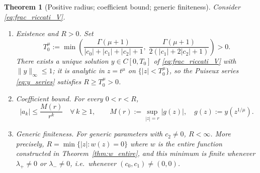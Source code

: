 \documentclass[12pt,a4paper]{amsart}
\newcommand{\assign}{:=}
\theoremstyle{plain}
\newtheorem{theorem}{Theorem}[section]
\theoremstyle{definition}
\theoremstyle{remark}
\begin{document}
\begin{theorem}[Positive radius; coefficient bound; generic
finiteness]\label{thm:radius}
Consider \eqref{eq:frac_riccati_V}.
\begin{enumerate}[label=(\roman*)]
\item \emph{Existence and $R>0$.} Set
\begin{equation}\label{eq:T0_choice}
  T_0^{\mu}\assign\min\!\left(
    \frac{\Gamma(\mu+1)}{|c_0|+|c_1|+|c_2|+1},\;
    \frac{\Gamma(\mu+1)}{2(|c_1|+2|c_2|+1)}
  \right)>0.
\end{equation}
There exists a unique solution $y\in C[0,T_0]$ of \eqref{eq:frac_riccati_V}
with $\|y\|_\infty\le 1$; it is analytic in $z=t^{\mu}$ on
$\{|z|<T_0^{\mu}\}$, so the Puiseux series \eqref{eq:y_series} satisfies
$R\ge T_0^{\mu}>0$.

\item \emph{Coefficient bound.} For every $0<r<R$,
\begin{equation}\label{eq:cauchy_bound}
  |a_k|\le\frac{M(r)}{r^k}\quad\forall\,k\ge 1,
  \qquad M(r)\assign\sup_{|z|=r}|g(z)|,\quad g(z)\assign y(z^{1/\mu}).
\end{equation}

\item \emph{Generic finiteness.}
For generic parameters with $c_2\ne 0$, $R<\infty$. More precisely,
$R=\min\{|z|:w(z)=0\}$ where $w$ is the entire function constructed in
Theorem~\ref{thm:w_entire}, and this minimum is finite whenever
$\lambda_+\ne 0$ or $\lambda_-\ne 0$, i.e.\ whenever $(c_0,c_1)\ne(0,0)$.
\end{enumerate}
\end{theorem}
\end{document}
